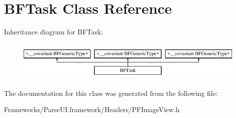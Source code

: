 \hypertarget{class_b_f_task}{}\section{B\+F\+Task Class Reference}
\label{class_b_f_task}
Inheritance diagram for B\+F\+Task\+:\begin{figure}[H]
\begin{center}
\leavevmode
\includegraphics[height=1.914530cm]{class_b_f_task}
\end{center}
\end{figure}


The documentation for this class was generated from the following file\+:\begin{DoxyCompactItemize}
\item 
Frameworks/\+Parse\+U\+I.\+framework/\+Headers/P\+F\+Image\+View.\+h\end{DoxyCompactItemize}
